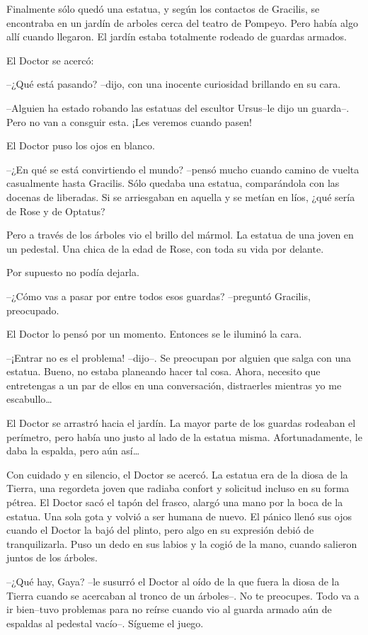 Finalmente sólo quedó una estatua, y según los contactos de Gracilis, se
encontraba en un jardín de arboles cerca del teatro de Pompeyo. Pero
había algo allí cuando llegaron. El jardín estaba totalmente rodeado de
guardas armados.

El Doctor se acercó:

--¿Qué está pasando? --dijo, con una inocente curiosidad brillando en su
cara.

--Alguien ha estado robando las estatuas del escultor Ursus--le dijo un
guarda--. Pero no van a consguir esta. ¡Les veremos cuando pasen!

El Doctor puso los ojos en blanco.

--¿En qué se está convirtiendo el mundo? --pensó mucho cuando camino de
vuelta casualmente hasta Gracilis. Sólo quedaba una estatua,
comparándola con las docenas de liberadas. Si se arriesgaban en aquella
y se metían en líos, ¿qué sería de Rose y de Optatus?

Pero a través de los árboles vio el brillo del mármol. La estatua de una
joven en un pedestal. Una chica de la edad de Rose, con toda su vida por
delante.

Por supuesto no podía dejarla.

--¿Cómo vas a pasar por entre todos esos guardas? --preguntó Gracilis,
preocupado.

El Doctor lo pensó por un momento. Entonces se le iluminó la cara.

--¡Entrar no es el problema! --dijo--. Se preocupan por alguien que
salga con una estatua. Bueno, no estaba planeando hacer tal cosa. Ahora,
necesito que entretengas a un par de ellos en una conversación,
distraerles mientras yo me escabullo\ldots{}

El Doctor se arrastró hacia el jardín. La mayor parte de los guardas
rodeaban el perímetro, pero había uno justo al lado de la estatua misma.
Afortunadamente, le daba la espalda, pero aún así\ldots{}

Con cuidado y en silencio, el Doctor se acercó. La estatua era de la
diosa de la Tierra, una regordeta joven que radiaba confort y solicitud
incluso en su forma pétrea. El Doctor sacó el tapón del frasco, alargó
una mano por la boca de la estatua. Una sola gota y volvió a ser humana
de nuevo. El pánico llenó sus ojos cuando el Doctor la bajó del plinto,
pero algo en su expresión debió de tranquilizarla. Puso un dedo en sus
labios y la cogió de la mano, cuando salieron juntos de los árboles.

--¿Qué hay, Gaya? --le susurró el Doctor al oído de la que fuera la
diosa de la Tierra cuando se acercaban al tronco de un árboles--. No te
preocupes. Todo va a ir bien--tuvo problemas para no reírse cuando vio
al guarda armado aún de espaldas al pedestal vacío--. Sígueme el juego.

